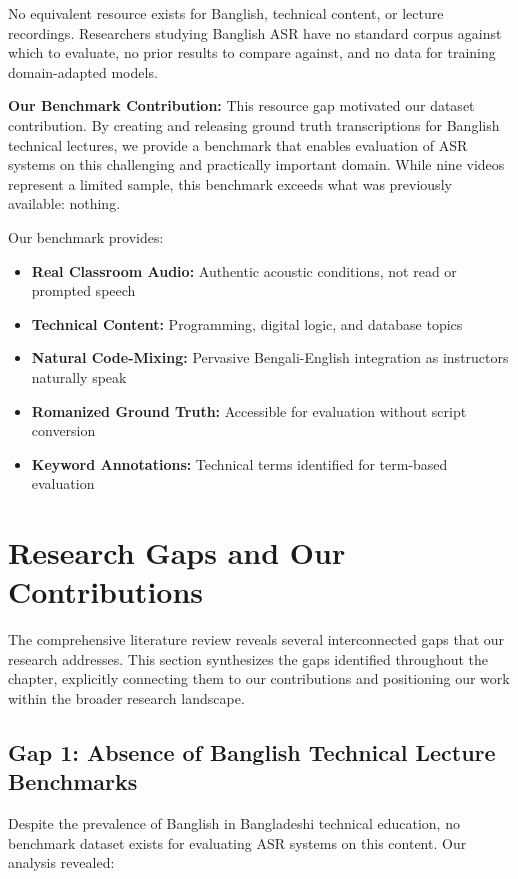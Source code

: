 No equivalent resource exists for Banglish, technical content, or lecture recordings. Researchers studying Banglish ASR have no standard corpus against which to evaluate, no prior results to compare against, and no data for training domain-adapted models.

\textbf{Our Benchmark Contribution:} This resource gap motivated our dataset contribution. By creating and releasing ground truth transcriptions for Banglish technical lectures, we provide a benchmark that enables evaluation of ASR systems on this challenging and practically important domain. While nine videos represent a limited sample, this benchmark exceeds what was previously available: nothing.

Our benchmark provides:
\begin{itemize}
    \item \textbf{Real Classroom Audio:} Authentic acoustic conditions, not read or prompted speech
    \item \textbf{Technical Content:} Programming, digital logic, and database topics
    \item \textbf{Natural Code-Mixing:} Pervasive Bengali-English integration as instructors naturally speak
    \item \textbf{Romanized Ground Truth:} Accessible for evaluation without script conversion
    \item \textbf{Keyword Annotations:} Technical terms identified for term-based evaluation
\end{itemize}

\section{Research Gaps and Our Contributions}

The comprehensive literature review reveals several interconnected gaps that our research addresses. This section synthesizes the gaps identified throughout the chapter, explicitly connecting them to our contributions and positioning our work within the broader research landscape.

\subsection{Gap 1: Absence of Banglish Technical Lecture Benchmarks}

Despite the prevalence of Banglish in Bangladeshi technical education, no benchmark dataset exists for evaluating ASR systems on this content. Our analysis revealed:

